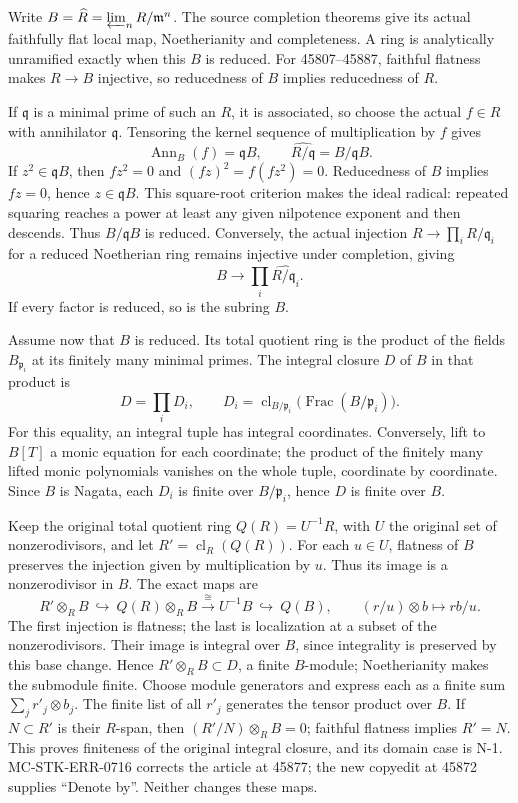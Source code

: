 Write \(B=\widehat R=\varprojlim_n R/\mathfrak m^n\). The source completion theorems give its actual faithfully flat local map, Noetherianity and completeness. A ring is analytically unramified exactly when this \(B\) is reduced. For 45807--45887, faithful flatness makes \(R\to B\) injective, so reducedness of \(B\) implies reducedness of \(R\).

If \(\mathfrak q\) is a minimal prime of such an \(R\), it is associated, so choose the actual \(f\in R\) with annihilator \(\mathfrak q\). Tensoring the kernel sequence of multiplication by \(f\) gives \[
 \operatorname{Ann}_B(f)=\mathfrak qB,
 \qquad \widehat{R/\mathfrak q}=B/\mathfrak qB.
\] If \(z^2\in\mathfrak qB\), then \(fz^2=0\) and \((fz)^2=f(fz^2)=0\). Reducedness of \(B\) implies \(fz=0\), hence \(z\in\mathfrak qB\). This square-root criterion makes the ideal radical: repeated squaring reaches a power at least any given nilpotence exponent and then descends. Thus \(B/\mathfrak qB\) is reduced. Conversely, the actual injection \(R\to\prod_i R/\mathfrak q_i\) for a reduced Noetherian ring remains injective under completion, giving \[
 B\longrightarrow\prod_i\widehat{R/\mathfrak q_i}.
\] If every factor is reduced, so is the subring \(B\).

Assume now that \(B\) is reduced. Its total quotient ring is the product of the fields \(B_{\mathfrak p_i}\) at its finitely many minimal primes. The integral closure \(D\) of \(B\) in that product is \[
 D=\prod_i D_i,\qquad
 D_i=\operatorname{cl}_{B/\mathfrak p_i}\bigl(\operatorname{Frac}(B/\mathfrak p_i)\bigr).
\] For this equality, an integral tuple has integral coordinates. Conversely, lift to \(B[T]\) a monic equation for each coordinate; the product of the finitely many lifted monic polynomials vanishes on the whole tuple, coordinate by coordinate. Since \(B\) is Nagata, each \(D_i\) is finite over \(B/\mathfrak p_i\), hence \(D\) is finite over \(B\).

Keep the original total quotient ring \(Q(R)=U^{-1}R\), with \(U\) the original set of nonzerodivisors, and let \(R'=\operatorname{cl}_R(Q(R))\). For each \(u\in U\), flatness of \(B\) preserves the injection given by multiplication by \(u\). Thus its image is a nonzerodivisor in \(B\). The exact maps are \[
 R'\otimes_R B\ \hookrightarrow\ Q(R)\otimes_R B
 \xrightarrow{\ \cong\ }U^{-1}B\ \hookrightarrow\ Q(B),
 \qquad (r/u)\otimes b\longmapsto rb/u.
\] The first injection is flatness; the last is localization at a subset of the nonzerodivisors. Their image is integral over \(B\), since integrality is preserved by this base change. Hence \(R'\otimes_R B\subset D\), a finite \(B\)-module; Noetherianity makes the submodule finite. Choose module generators and express each as a finite sum \(\sum_j r'_j\otimes b_j\). The finite list of all \(r'_j\) generates the tensor product over \(B\). If \(N\subset R'\) is their \(R\)-span, then \((R'/N)\otimes_R B=0\); faithful flatness implies \(R'=N\). This proves finiteness of the original integral closure, and its domain case is N-1. MC-STK-ERR-0716 corrects the article at 45877; the new copyedit at 45872 supplies ``Denote by''. Neither changes these maps.

